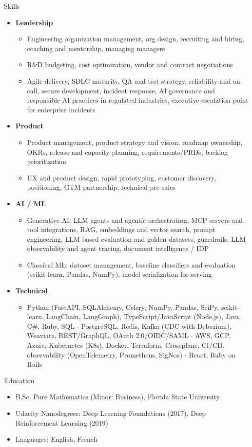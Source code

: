 \documentclass[10pt,oneside]{article}
\newenvironment{ressection}[1]{
  \vspace{4pt}
  {\fontfamily{phv}\selectfont\Large#1}
  \begin{itemize}
    \vspace{3pt}
}{
  \end{itemize}
}
\newcommand{\resitem}[1]{
  \vspace{-4pt}
\item \begin{flushleft} #1 \end{flushleft}
}
\newcommand{\ressubitem}[1]{
  \vspace{-1pt}
\item \begin{flushleft} #1 \end{flushleft}
}
\newenvironment{reslist}[1]{
  \resitem{\textbf{#1}}
  \vspace{-5pt}
  \begin{itemize}
}{
  \end{itemize}
}
\begin{document}
\begin{ressection}{Skills}
  \begin{reslist}{Leadership}
    \ressubitem{Engineering organization management, org design, recruiting and hiring, coaching and mentorship, managing managers}
    \ressubitem{R\&D budgeting, cost optimization, vendor and contract negotiations}
    \ressubitem{Agile delivery, SDLC maturity, QA and test strategy, reliability and on-call, secure development, incident response, AI governance and responsible-AI practices in regulated industries, executive escalation point for enterprise incidents}
  \end{reslist}
  \begin{reslist}{Product}
    \ressubitem{Product management, product strategy and vision, roadmap ownership, OKRs, release and capacity planning, requirements/PRDs, backlog prioritization}
    \ressubitem{UX and product design, rapid prototyping, customer discovery, positioning, GTM partnership, technical pre-sales}
  \end{reslist}
  \begin{reslist}{AI / ML}
    \ressubitem{Generative AI: LLM agents and agentic orchestration, MCP servers and tool integrations, RAG, embeddings and vector search, prompt engineering, LLM-based evaluation and golden datasets, guardrails, LLM observability and agent tracing, document intelligence / IDP}
    \ressubitem{Classical ML: dataset management, baseline classifiers and evaluation (scikit-learn, Pandas, NumPy), model serialization for serving}
  \end{reslist}
  \begin{reslist}{Technical}
    \ressubitem{Python (FastAPI, SQLAlchemy, Celery, NumPy, Pandas, SciPy, scikit-learn, LangChain, LangGraph), TypeScript/JavaScript (Node.js), Java, C\#, Ruby, SQL $\cdot$ PostgreSQL, Redis, Kafka (CDC with Debezium), Weaviate, REST/GraphQL, OAuth 2.0/OIDC/SAML $\cdot$ AWS, GCP, Azure, Kubernetes (K8s), Docker, Terraform, Crossplane, CI/CD, observability (OpenTelemetry, Prometheus, SigNoz) $\cdot$ React, Ruby on Rails}
  \end{reslist}
\end{ressection}

\begin{ressection}{Education}
  \ressubitem{B.Sc. Pure Mathematics (Minor: Business), Florida State University}
  \ressubitem{Udacity Nanodegrees: Deep Learning Foundations (2017), Deep Reinforcement Learning (2019)}
  \ressubitem{Languages: English, French}
\end{ressection}
\end{document}
